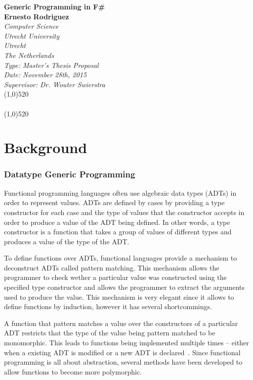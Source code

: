 \documentclass[8pt]{extarticle}
\author{Ernesto Rodriguez}
\begin{document}
\Huge{\bf Generic Programming in F\#\\[1cm]}
\large{\bf Ernesto Rodriguez\\[0.5cm]}
\emph{Computer Science \\ Utrecht University \\ Utrecht \\ The Netherlands \\[0.5cm]}
\emph{Type: Master's Thesis Proposal \\ Date: November 28th, 2015 \\ Supervisor: Dr. Wouter Swierstra\\}
\line(1,0){520}\\ \\
\line(1,0){520}

\part{Background}
\section{Datatype Generic Programming}

Functional programming languages often use algebraic data types (ADTs)
in order to represent values. ADTs are defined by cases by providing a
type constructor for each case and the type of values that the
constructor accepts in order to produce a value of the ADT being
defined. In other words, a type constructor is a function that takes a
group of values of different types and produces a value of the type of
the ADT.

To define functions over ADTs, functional languages provide a
mechanism to deconstruct ADTs called pattern matching. This mechanism
allows the programmer to check wether a particular value was
constructed using the specified type constructor and allows the
programmer to extract the arguments used to produce the value. This
mechanism is very elegant since it allows to define functions by
induction, however it has several shortcommings.

A function that pattern matches a value over the constructors of a
particular ADT restricts that the type of the value being pattern
matched to be monomorphic. This leads to functions being implemented
multiple times -- either when a existing ADT is modified or a new ADT
is declared~\cite{polyp}. Since functional programming is all about
abstraction, several methods have been developed to allow functions to
become more polymorphic.
\end{document}
